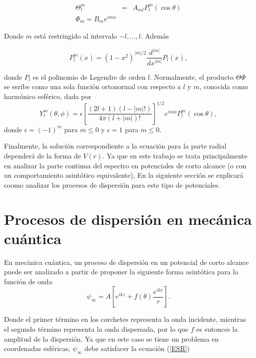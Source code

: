 \begin{eqnarray*}
	\Theta^m_l & = & A_{ml} P^m_l(\cos{\theta})
	\\
	\Phi_m =B_m  e^{i m \phi}
\end{eqnarray*}

Donde $m$ está restringido al intervalo $-l, ... ,l$. Además

\begin{equation*}
	P^m_l(x) = (1-x^2)^{|m|/2} \frac{d^{|m|}}{dx^{|m|}} P_l(x),
\end{equation*}

donde $P_l$ es el polinomio de Legendre de orden $l$. Normalmente, el producto $\Theta \Phi$ se esribe como una sola función ortonormal con respecto a $l$ y $m$, conocida como harmónico esférico, dada por
\begin{equation*}
Y^m_l(\theta,\phi) = \epsilon \left[ \frac{(2l + 1)(l - |m|!)}{4 \pi (l + |m|)!}\right]^{1/2} e^{i m \phi}P^m_l(\cos{\theta}),
\end{equation*}
donde $\epsilon=(-1)^m$ para $m \le 0$ y $\epsilon=1$ para $m \le 0$.

Finalmente, la solución correspondiente a la ecuación para la parte radial dependerá de la forma de $V(r)$.
Ya que en este trabajo se trata principalmente en analizar la parte continua del espectro en potenciales de corto alcance (o con un comportamiento asintótico equivalente), En la siguiente sección se explicará coomo analizar los procesos de dispersión para este tipo de potenciales.



\section{Procesos de dispersión en mecánica cuántica}

En mecánica cuántica, un proceso de dispersión en un potencial de corto alcance puede ser analizado a partir de proponer la siguiente forma asintótica para la función de onda
\begin{equation}
	\psi_{\infty} = A \left[e^{i k z} + f(\theta)  \frac{e^{i k r}}{r} \right]. \label{FAD}
\end{equation}

Donde el primer término en los corchetes representa la onda incidente, mientras el segundo término representa la onda dispersada, por lo que $f$ es entonces la amplitud de la dispersión. Ya que en este caso se tiene un problema en coordenadas esféricas, $\psi_\infty$ debe satisfacer la ecuación (\ref{ESR})



